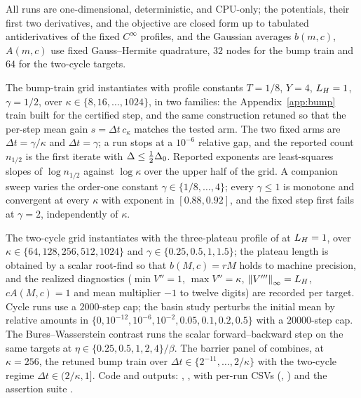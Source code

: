 All runs are one-dimensional, deterministic, and CPU-only; the potentials, their first two
derivatives, and the objective are closed form up to tabulated antiderivatives of the fixed
$C^\infty$ profiles, and the Gaussian averages $b(m,c)$, $A(m,c)$ use fixed Gauss--Hermite
quadrature, $32$ nodes for the bump train and $64$ for the two-cycle targets.

The bump-train grid instantiates  with profile constants
$T=1/8$, $Y=4$, $L_H=1$, $\gamma=1/2$, over
$\kappa\in\{8,16,\dots,1024\}$, in two families: the Appendix~\ref{app:bump} train built for
the certified step, and the same construction retuned so that the per-step mean gain
$s=\Delta t\,c_\kappa$ matches the tested arm. The two fixed arms are
$\Delta t=\gamma/\kappa$ and $\Delta t=\gamma$; a run stops at a $10^{-6}$ relative gap, and
the reported count $n_{1/2}$ is the first iterate with
$\Delta\leq\tfrac12\Delta_0$. Reported exponents are least-squares slopes of
$\log n_{1/2}$ against $\log\kappa$ over the upper half of the grid. A companion sweep
varies the order-one constant $\gamma\in\{1/8,\dots,4\}$; every $\gamma\leq1$ is monotone
and convergent at every $\kappa$ with exponent in $[0.88,0.92]$, and the fixed step first
fails at $\gamma=2$, independently of $\kappa$.

The two-cycle grid instantiates  with the three-plateau profile of
 at $L_H=1$, over $\kappa\in\{64,128,256,512,1024\}$ and
$\gamma\in\{0.25,0.5,1,1.5\}$; the plateau length is obtained by a scalar root-find so that
$b(M,c)=rM$ holds to machine precision, and the realized diagnostics
($\min V''=1$, $\max V''=\kappa$, $\left\lVert V'''\right\rVert_\infty=L_H$, $cA(M,c)=1$ and mean multiplier
$-1$ to twelve digits) are recorded per target. Cycle runs use a $2000$-step cap; the basin
study perturbs the initial mean by relative amounts in $\{0,10^{-12},10^{-6},
10^{-2},0.05,0.1,0.2,0.5\}$ with a $20000$-step cap. The Bures--Wasserstein contrast runs
the scalar forward--backward step on the same targets at
$\eta\in\{0.25,0.5,1,2,4\}/\beta$. The barrier panel of  combines, at
$\kappa=256$, the retuned bump train over
$\Delta t\in\{2^{-11},\dots,2/\kappa\}$ with the two-cycle regime
$\Delta t\in(2/\kappa,1]$. Code and outputs:
,
, with per-run CSVs
(, ) and the assertion suite
.

